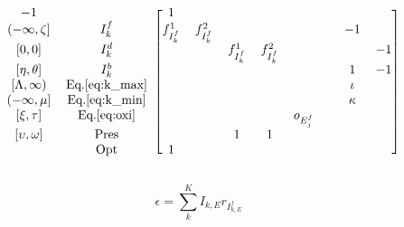 \documentclass[]{elsarticle}
\begin{document}
\begin{equation}
\begin{blockarray}{cccccccccc}
\begin{block}{cc[cccccccc]}
            -1                 &                   & 1                 &
             \\
            {(-\infty,\zeta]} & I_{k}^{f}         & f_{I_{k}^{f}}^{1} &
            f_{I_{k}^{f}}^{2}  &                   &                   &
                               &                   & -1                &
             \\
            {[0,0]}            & I_{k}^{d}         &                   &
                               & f_{I_{k}^{f}}^{1} & f_{I_{k}^{f}}^{2} &
                               &                   &                   &
            -1 \\
            {[\eta, \theta]}
                               & I_{k}^{b}         &                   &
                               &                   &                   &
                               &                   & 1                 &
            -1 \\ 
            {[\Lambda, \infty)} & \text{Eq.}\ref{eq:k_max}&            &
                               &                   &                   &
                               &                   & \iota             &
             \\
            {(-\infty, \mu]}   & \text{Eq.}\ref{eq:k_min} &            &
                               &                   &                   &
                               &                   & \kappa            & 
             \\
            {[\xi,\tau]}    & \text{Eq.}\ref{eq:oxi} &                 &
                               &                   &                   &
             o_{E_{j}^{f}}     &                   &                   &
             \\
            {[\upsilon,\omega]} & \text{Pres}      &                   &
                               & 1                 & 1                 &
                               &                   &                   &
             \\
                               & \text{Opt}        & 1                 &
                               &                   &                   &
                               &                   &                   &
             \\
            \end{block}
        \end{blockarray}
    \end{equation}

\begin{equation}
\label{eq:epsilon_def}
\epsilon = \sum \limits_{k}^{K} I_{k,E} r_{I_{k,E}^{f}}
\end{equation}
\end{document}
